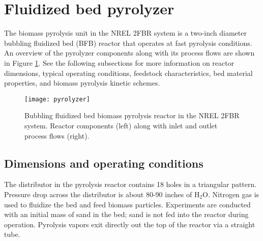 
\section{Fluidized bed pyrolyzer}

The biomass pyrolysis unit in the NREL 2FBR system is a two-inch diameter bubbling fluidized bed (BFB) reactor that operates at fast pyrolysis conditions. An overview of the pyrolyzer components along with its process flows are shown in Figure \ref{fig:pyrolyzer}. See the following subsections for more information on reactor dimensions, typical operating conditions, feedstock characteristics, bed material properties, and biomass pyrolysis kinetic schemes.

\begin{figure}[H]
    \centering
    \texttt{[image: pyrolyzer]}
    \caption{Bubbling fluidized bed biomass pyrolysis reactor in the NREL 2FBR system. Reactor components (left) along with inlet and outlet process flows (right).}
    \label{fig:pyrolyzer}
\end{figure}

\subsection{Dimensions and operating conditions}

The distributor in the pyrolysis reactor contains 18 holes in a triangular pattern. Pressure drop across the distributor is about 80-90 inches of H$_2$O. Nitrogen gas is used to fluidize the bed and feed biomass particles. Experiments are conducted with an initial mass of sand in the bed; sand is not fed into the reactor during operation. Pyrolysis vapors exit directly out the top of the reactor via a straight tube.

